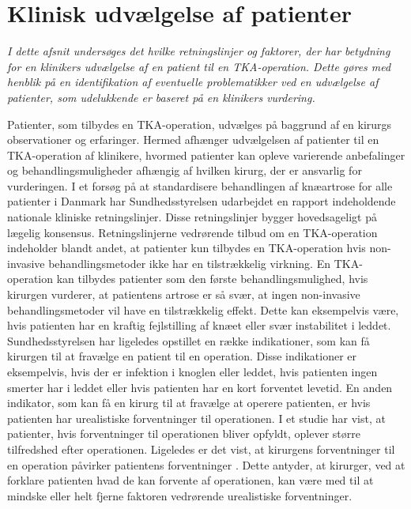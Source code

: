 \section{Klinisk udvælgelse af patienter}\label{kliniskudvaelgelse}
\textit{I dette afsnit undersøges det hvilke retningslinjer og faktorer, der har betydning for en klinikers udvælgelse af en patient til en TKA-operation. Dette gøres med henblik på en identifikation af eventuelle problematikker ved en udvælgelse af patienter, som udelukkende er baseret på en klinikers vurdering.}

Patienter, som tilbydes en TKA-operation, udvælges på baggrund af en kirurgs observationer og erfaringer. Hermed afhænger udvælgelsen af patienter til en TKA-operation af klinikere, hvormed patienter kan opleve varierende anbefalinger og behandlingsmuligheder afhængig af hvilken kirurg, der er ansvarlig for vurderingen.  I et forsøg på at standardisere behandlingen af knæartrose for alle patienter i Danmark har Sundhedsstyrelsen udarbejdet en rapport indeholdende nationale kliniske retningslinjer. Disse retningslinjer bygger hovedsageligt på lægelig konsensus. Retningslinjerne vedrørende tilbud om en TKA-operation indeholder blandt andet, at patienter kun tilbydes en TKA-operation hvis non-invasive behandlingsmetoder ikke har en tilstrækkelig virkning. En TKA-operation kan tilbydes patienter som den første behandlingsmulighed, hvis kirurgen vurderer, at patientens artrose er så svær, at ingen non-invasive behandlingsmetoder vil have en tilstrækkelig effekt. Dette kan eksempelvis være, hvis patienten har en kraftig fejlstilling af knæet eller svær instabilitet i leddet. \citep{brostrom2012} \\
Sundhedsstyrelsen har ligeledes opstillet en række indikationer, som kan få kirurgen til at fravælge en patient til en operation. Disse indikationer er eksempelvis, hvis der er infektion i knoglen eller leddet, hvis patienten ingen smerter har i leddet eller hvis patienten har en kort forventet levetid. En anden indikator, som kan få en kirurg til at fravælge at operere patienten, er hvis patienten har urealistiske forventninger til operationen. \citep{brostrom2012} I et studie har  vist, at patienter, hvis forventninger til operationen bliver opfyldt, oplever større tilfredshed efter operationen. Ligeledes er det vist, at kirurgens forventninger til en operation påvirker patientens forventninger \citep{tejada2010}. Dette antyder, at kirurger, ved at forklare patienten hvad de kan forvente af operationen, kan være med til at mindske eller helt fjerne faktoren vedrørende urealistiske forventninger. \\
